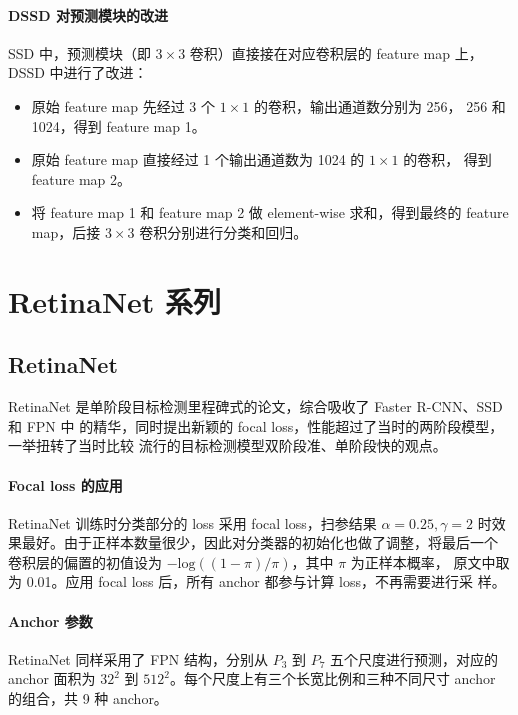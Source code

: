 \paragraph{DSSD 对预测模块的改进}
SSD 中，预测模块（即 $3 \times 3$ 卷积）直接接在对应卷积层的 feature map 上，
DSSD 中进行了改进：

\begin{itemize}
  \item 原始 feature map 先经过 3 个 $1 \times 1$ 的卷积，输出通道数分别为 256，
    256 和 1024，得到 feature map 1。
  \item 原始 feature map 直接经过 1 个输出通道数为 1024 的 $1 \times 1$ 的卷积，
    得到 feature map 2。
  \item 将 feature map 1 和 feature map 2 做 element-wise 求和，得到最终的
    feature map，后接 $3 \times 3$ 卷积分别进行分类和回归。
\end{itemize}

\section{RetinaNet 系列}

\subsection{RetinaNet}
\label{sub:RetinaNet}

RetinaNet 是单阶段目标检测里程碑式的论文，综合吸收了 Faster R-CNN、SSD 和 FPN 中
的精华，同时提出新颖的 focal loss，性能超过了当时的两阶段模型，一举扭转了当时比较
流行的目标检测模型双阶段准、单阶段快的观点。

\paragraph{Focal loss 的应用}
RetinaNet 训练时分类部分的 loss 采用 focal loss，扫参结果 $\alpha = 0.25, \gamma
= 2$ 时效果最好。由于正样本数量很少，因此对分类器的初始化也做了调整，将最后一个
卷积层的偏置的初值设为 $-\mathrm{log}((1 - \pi)/ \pi)$，其中 $\pi$ 为正样本概率，
原文中取为 0.01。应用 focal loss 后，所有 anchor 都参与计算 loss，不再需要进行采
样。

\paragraph{Anchor 参数}
RetinaNet 同样采用了 FPN 结构，分别从 $P_3$ 到 $P_7$ 五个尺度进行预测，对应的
anchor 面积为 $32^2$ 到 $512^2$。每个尺度上有三个长宽比例和三种不同尺寸 anchor
的组合，共 9 种 anchor。


